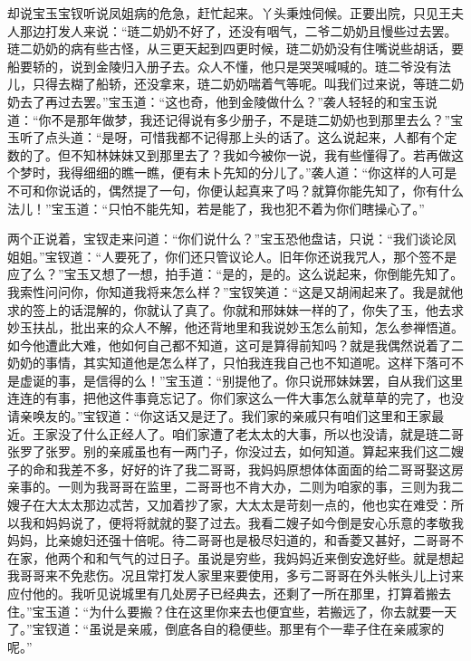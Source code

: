 


\begin{parag}
    却说宝玉宝钗听说凤姐病的危急，赶忙起来。丫头秉烛伺候。正要出院，只见王夫人那边打发人来说：“琏二奶奶不好了，还没有咽气，二爷二奶奶且慢些过去罢。琏二奶奶的病有些古怪，从三更天起到四更时候，琏二奶奶没有住嘴说些胡话，要船要轿的，说到金陵归入册子去。众人不懂，他只是哭哭喊喊的。琏二爷没有法儿，只得去糊了船轿，还没拿来，琏二奶奶喘着气等呢。叫我们过来说，等琏二奶奶去了再过去罢。”宝玉道：“这也奇，他到金陵做什么？”袭人轻轻的和宝玉说道：“你不是那年做梦，我还记得说有多少册子，不是琏二奶奶也到那里去么？”宝玉听了点头道：“是呀，可惜我都不记得那上头的话了。这么说起来，人都有个定数的了。但不知林妹妹又到那里去了？我如今被你一说，我有些懂得了。若再做这个梦时，我得细细的瞧一瞧，便有未卜先知的分儿了。”袭人道：“你这样的人可是不可和你说话的，偶然提了一句，你便认起真来了吗？就算你能先知了，你有什么法儿！”宝玉道：“只怕不能先知，若是能了，我也犯不着为你们瞎操心了。”
\end{parag}


\begin{parag}
    两个正说着，宝钗走来问道：“你们说什么？”宝玉恐他盘诘，只说：“我们谈论凤姐姐。”宝钗道：“人要死了，你们还只管议论人。旧年你还说我咒人，那个签不是应了么？”宝玉又想了一想，拍手道：“是的，是的。这么说起来，你倒能先知了。我索性问问你，你知道我将来怎么样？”宝钗笑道：“这是又胡闹起来了。我是就他求的签上的话混解的，你就认了真了。你就和邢妹妹一样的了，你失了玉，他去求妙玉扶乩，批出来的众人不解，他还背地里和我说妙玉怎么前知，怎么参禅悟道。如今他遭此大难，他如何自己都不知道，这可是算得前知吗？就是我偶然说着了二奶奶的事情，其实知道他是怎么样了，只怕我连我自己也不知道呢。这样下落可不是虚诞的事，是信得的么！”宝玉道：“别提他了。你只说邢妹妹罢，自从我们这里连连的有事，把他这件事竟忘记了。你们家这么一件大事怎么就草草的完了，也没请亲唤友的。”宝钗道：“你这话又是迂了。我们家的亲戚只有咱们这里和王家最近。王家没了什么正经人了。咱们家遭了老太太的大事，所以也没请，就是琏二哥张罗了张罗。别的亲戚虽也有一两门子，你没过去，如何知道。算起来我们这二嫂子的命和我差不多，好好的许了我二哥哥，我妈妈原想体体面面的给二哥哥娶这房亲事的。一则为我哥哥在监里，二哥哥也不肯大办，二则为咱家的事，三则为我二嫂子在大太太那边忒苦，又加着抄了家，大太太是苛刻一点的，他也实在难受：所以我和妈妈说了，便将将就就的娶了过去。我看二嫂子如今倒是安心乐意的孝敬我妈妈，比亲媳妇还强十倍呢。待二哥哥也是极尽妇道的，和香菱又甚好，二哥哥不在家，他两个和和气气的过日子。虽说是穷些，我妈妈近来倒安逸好些。就是想起我哥哥来不免悲伤。况且常打发人家里来要使用，多亏二哥哥在外头帐头儿上讨来应付他的。我听见说城里有几处房子已经典去，还剩了一所在那里，打算着搬去住。”宝玉道：“为什么要搬？住在这里你来去也便宜些，若搬远了，你去就要一天了。”宝钗道：“虽说是亲戚，倒底各自的稳便些。那里有个一辈子住在亲戚家的呢。”
\end{parag}


